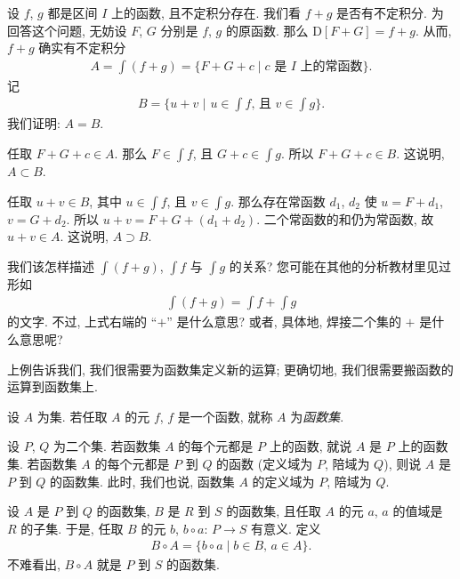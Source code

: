 \begin{example}
    设 $f$, $g$ 都是区间 $I$ 上的函数, 且不定积分存在. 我们看 $f + g$ 是否有不定积分. 为回答这个问题, 无妨设 $F$, $G$ 分别是 $f$, $g$ 的原函数. 那么 $\mathrm{D}[F + G] = f + g$. 从而, $f + g$ 确实有不定积分
    \begin{align*}
        A = \int {(f + g)} = \{ F + G + c \mid \text{$c$ 是 $I$ 上的常函数} \}.
    \end{align*}
    记
    \begin{align*}
        B = \Bigg\{ u + v \,\,\Bigg|\,\, \text{$u \in \int {f}$, 且 $v \in \int {g}$} \Bigg\}.
    \end{align*}
    我们证明: $A = B$.

    任取 $F + G + c \in A$. 那么 $F \in \int {f}$, 且 $G + c \in \int {g}$. 所以 $F + G + c \in B$. 这说明, $A \subset B$.

    任取 $u + v \in B$, 其中 $u \in \int {f}$, 且 $v \in \int {g}$. 那么存在常函数 $d_1$, $d_2$ 使 $u = F + d_1$, $v = G + d_2$. 所以 $u + v = F + G + (d_1 + d_2)$. 二个常函数的和仍为常函数, 故 $u + v \in A$. 这说明, $A \supset B$.

    我们该怎样描述 $\int {(f + g)}$, $\int {f}$ 与 $\int {g}$ 的关系? 您可能在其他的分析教材里见过形如
    \begin{align*}
        \int {(f + g)} = \int {f} + \int {g}
    \end{align*}
    的文字. 不过, 上式右端的 ``$+$'' 是什么意思? 或者, 具体地, 焊接二个集的 $+$ 是什么意思呢?
\end{example}

上例告诉我们, 我们很需要为函数集定义新的运算; 更确切地, 我们很需要搬函数的运算到函数集上.

\begin{definition}
    设 $A$ 为集. 若任取 $A$ 的元 $f$, $f$ 是一个函数, 就称 $A$ 为\emph{函数集}.

    设 $P$, $Q$ 为二个集. 若函数集 $A$ 的每个元都是 $P$ 上的函数, 就说 $A$ 是 $P$ 上的函数集. 若函数集 $A$ 的每个元都是 $P$ 到 $Q$ 的函数 (定义域为 $P$, 陪域为 $Q$), 则说 $A$ 是 $P$ 到 $Q$ 的函数集. 此时, 我们也说, 函数集 $A$ 的定义域为 $P$, 陪域为 $Q$.
\end{definition}

\begin{definition}
    设 $A$ 是 $P$ 到 $Q$ 的函数集, $B$ 是 $R$ 到 $S$ 的函数集, 且任取 $A$ 的元 $a$, $a$ 的值域是 $R$ 的子集. 于是, 任取 $B$ 的元 $b$, $b \circ a$: $P \to S$ 有意义. 定义
    \begin{align*}
        B \circ A = \{ b \circ a \mid \text{$b \in B$, $a \in A$} \}.
    \end{align*}
    不难看出, $B \circ A$ 就是 $P$ 到 $S$ 的函数集.
\end{definition}

